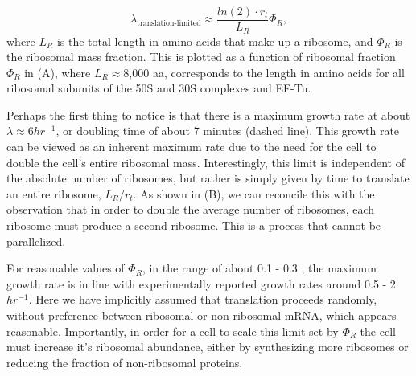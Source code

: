\begin{equation}
\lambda_{\textrm{translation-limited}} \approx \frac{ln(2) \cdot r_t}{L_R}  \Phi_R,
\label{eq:translation_limit_growth_rate}
\end{equation}
where $L_R$ is the total length in amino acids that make up a ribosome, and
$\Phi_R$ is the ribosomal mass fraction. This is plotted as a function of
ribosomal fraction $\Phi_R$ in (A), where $L_R \approx $8,000 aa,
corresponds to the length in amino
acids for all ribosomal subunits of the 50S and 30S complexes and EF-Tu.

Perhaps the first thing to notice is that there is a maximum growth rate at
about $\lambda \approx 6 hr^{-1}$, or doubling time of about 7 minutes (dashed
line). This growth rate can be viewed as an inherent maximum rate due to
the need for the cell to double the cell's entire ribosomal mass. Interestingly,
this limit is independent of the absolute number of ribosomes, but rather is
simply given by time to translate an entire ribosome, $L_R/ r_t$. As shown in
(B), we can reconcile this with the observation that in order
to double the average number of ribosomes, each ribosome must produce a second
ribosome. This is a process that cannot be parallelized.

For reasonable values of $\Phi_R$, in the range of about 0.1 - 0.3
\citep{scott2010}, the maximum growth rate is in line with experimentally
reported growth rates around 0.5 - 2 $hr^{-1}$. Here we have implicitly assumed
that translation proceeds randomly, without preference between ribosomal or
non-ribosomal mRNA, which appears reasonable. Importantly, in order for a cell
to scale this limit set by $\Phi_R$ the cell must increase it's ribosomal
abundance, either by synthesizing more ribosomes or reducing the fraction of
non-ribosomal proteins.

